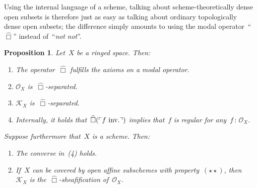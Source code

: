 \documentclass[10pt]{amsart}
\makeatletter
\theoremstyle{definition}
\theoremstyle{plain}
\newtheorem{prop}[defn]{Proposition}
\theoremstyle{remark}
\renewcommand{\O}{\mathcal{O}}
\newcommand{\K}{\mathcal{K}}
\newcommand{\?}{\,{:}\,}
\renewcommand{\_}{\mathpunct{.}\,}
\newcommand{\speak}[1]{\ulcorner\text{\textnormal{#1}}\urcorner}
\newcommand{\sdense}{{\widehat\Box}}
\newcommand{\inv}{inv.\@}
\newcommand{\notnot}{\emph{not not}\xspace}
\makeatother
\begin{document}
Using the internal language of a scheme, talking about scheme-theoretically
dense open subsets is therefore just as easy as talking about ordinary
topologically dense open subsets; the difference simply amounts to using the
modal operator~``$\sdense$'' instead of~``\notnot''.

\begin{prop}\label{prop:kx-is-box-sheafification}
Let~$X$ be a ringed space. Then:
\begin{enumerate}
\item The operator~$\sdense$ fulfills the axioms on a modal operator.
\item $\O_X$ is~$\sdense$-separated.
\item $\K_X$ is~$\sdense$-separated.
\item Internally, it holds that~$\sdense(\speak{$f$ \inv})$ implies that~$f$ is
regular for any~$f\?\O_X$.
\end{enumerate}
Suppose furthermore that~$X$ is a scheme. Then:
\begin{enumerate}
\addtocounter{enumi}{4}
\item The converse in~(4) holds.
\item If~$X$ can be covered by open affine subschemes with
property~$(\star\star)$, then $\K_X$ is the~$\sdense$-sheafification of~$\O_X$.
\end{enumerate}
\end{prop}
\end{document}
